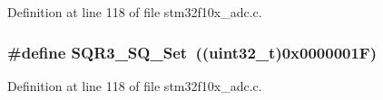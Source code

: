 Definition at line 118 of file stm32f10x\+\_\+adc.\+c.

\subsubsection[{\texorpdfstring{S\+Q\+R3\+\_\+\+S\+Q\+\_\+\+Set}{SQR3_SQ_Set}}]{\setlength{\rightskip}{0pt plus 5cm}\#define S\+Q\+R3\+\_\+\+S\+Q\+\_\+\+Set~(({\bf uint32\+\_\+t})0x0000001\+F)}\hypertarget{group___a_d_c___private___defines_ga8a04f115021dc5261562b4dc04c01109}{}\label{group___a_d_c___private___defines_ga8a04f115021dc5261562b4dc04c01109}


Definition at line 118 of file stm32f10x\+\_\+adc.\+c.


